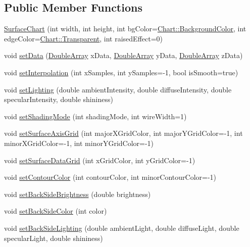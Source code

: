 \subsection*{Public Member Functions}
\begin{DoxyCompactItemize}
\item 
\hyperlink{class_surface_chart_aea521053e932bb67de6d982e6d50e8bc}{Surface\+Chart} (int width, int height, int bg\+Color=\hyperlink{namespace_chart_abee0d882fdc9ad0b001245ad9fc64011a134193bde693b9d152d0c6dc59fa7d7f}{Chart\+::\+Background\+Color}, int edge\+Color=\hyperlink{namespace_chart_abee0d882fdc9ad0b001245ad9fc64011afc6811800a9e2582dac0157b6279f836}{Chart\+::\+Transparent}, int raised\+Effect=0)
\item 
void \hyperlink{class_surface_chart_a30e7444d85c949637b7f4a395db57120}{set\+Data} (\hyperlink{class_double_array}{Double\+Array} x\+Data, \hyperlink{class_double_array}{Double\+Array} y\+Data, \hyperlink{class_double_array}{Double\+Array} z\+Data)
\item 
void \hyperlink{class_surface_chart_a41aa8666548588bb1cb3baf266f96b44}{set\+Interpolation} (int x\+Samples, int y\+Samples=-\/1, bool is\+Smooth=true)
\item 
void \hyperlink{class_surface_chart_a6d1f1a35b9008f3d1352a9b2d335196c}{set\+Lighting} (double ambient\+Intensity, double diffuse\+Intensity, double specular\+Intensity, double shininess)
\item 
void \hyperlink{class_surface_chart_afde084d320bd98c83da03762f134ed59}{set\+Shading\+Mode} (int shading\+Mode, int wire\+Width=1)
\item 
void \hyperlink{class_surface_chart_adadc7459ccf0e2aa4d32d52f5d3ea4b2}{set\+Surface\+Axis\+Grid} (int major\+X\+Grid\+Color, int major\+Y\+Grid\+Color=-\/1, int minor\+X\+Grid\+Color=-\/1, int minor\+Y\+Grid\+Color=-\/1)
\item 
void \hyperlink{class_surface_chart_ad048fb7f9b93ec63ae529bba894cea39}{set\+Surface\+Data\+Grid} (int x\+Grid\+Color, int y\+Grid\+Color=-\/1)
\item 
void \hyperlink{class_surface_chart_afd3357880657ab5b2301c4a3c7d233bb}{set\+Contour\+Color} (int contour\+Color, int minor\+Contour\+Color=-\/1)
\item 
void \hyperlink{class_surface_chart_a8d7c77fe6e72c7a0cdb4f9b7fe3ee886}{set\+Back\+Side\+Brightness} (double brightness)
\item 
void \hyperlink{class_surface_chart_a94b772a2242149700813a53810bb437d}{set\+Back\+Side\+Color} (int color)
\item 
void \hyperlink{class_surface_chart_ae77d941a6c2a2d62c60cc2d3cc5f6f6b}{set\+Back\+Side\+Lighting} (double ambient\+Light, double diffuse\+Light, double specular\+Light, double shininess)
\end{DoxyCompactItemize}
